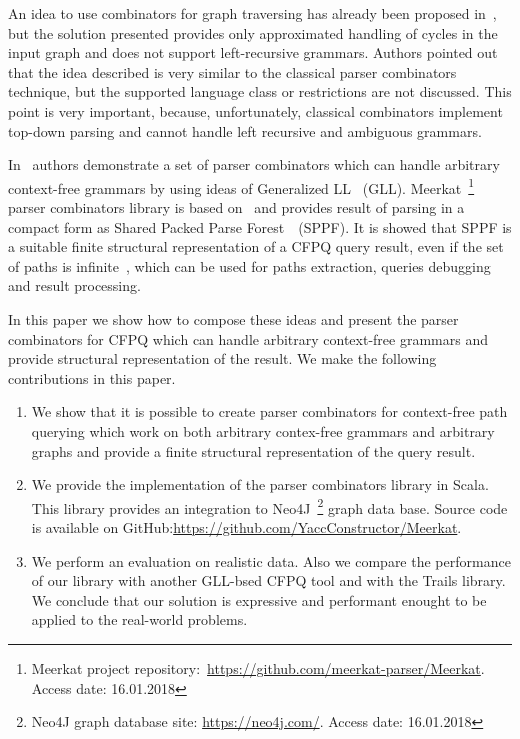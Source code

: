An idea to use combinators for graph traversing has already been proposed in~\cite{ScalaGraphParsing}, but the solution presented provides only approximated handling of cycles in the input graph and does not support left-recursive grammars. 
Authors pointed out that the idea described is very similar to the classical parser combinators technique, but the supported language class or restrictions are not discussed.
This point is very important, because, unfortunately, classical combinators implement top-down parsing and cannot handle left recursive and ambiguous grammars.

In~\cite{Meerkat} authors demonstrate a set of parser combinators which can handle arbitrary context-free grammars by using ideas of Generalized LL~\cite{scott2010gll} (GLL).
Meerkat~\footnote{Meerkat project repository:~\url{https://github.com/meerkat-parser/Meerkat}. Access date: 16.01.2018} parser combinators library is based on~\cite{Meerkat}
 and provides result of parsing in a compact form as Shared Packed Parse Forest~\cite{SPPF}~(SPPF).
It is showed that SPPF is a suitable finite structural representation of a CFPQ query result, even if the set of paths is infinite~\cite{GrigorevR16}, which can be used for paths extraction, queries debugging and result processing.

In this paper we show how to compose these ideas and present the parser combinators for CFPQ which can handle arbitrary context-free grammars and provide structural representation of the result.
We make the following contributions in this paper.

\begin{enumerate}
\item We show that it is possible to create parser combinators for context-free path querying which work on both arbitrary contex-free grammars and arbitrary graphs and provide a finite structural representation of the query result.
\item We provide the implementation of the parser combinators library in Scala. This library provides an integration to Neo4J~\footnote{Neo4J graph database site: \url{https://neo4j.com/}. Access date: 16.01.2018} graph data base. Source code is available on GitHub:\url{https://github.com/YaccConstructor/Meerkat}.
\item We perform an evaluation on realistic data. 
Also we compare the performance of our library with another GLL-bsed CFPQ tool and with the Trails library.
We conclude that our solution is expressive and performant enought to be applied to the real-world problems. 
\end{enumerate}